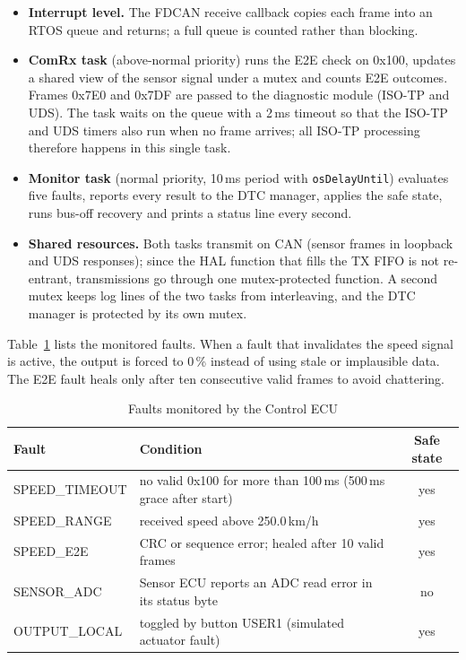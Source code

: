 \begin{itemize}
  \item \textbf{Interrupt level.} The FDCAN receive callback copies each frame into an RTOS queue and returns; a full queue is counted rather than blocking.
  \item \textbf{ComRx task} (above-normal priority) runs the E2E check on 0x100, updates a shared view of the sensor signal under a mutex and counts E2E outcomes. Frames 0x7E0 and 0x7DF are passed to the diagnostic module (ISO-TP and UDS). The task waits on the queue with a 2\,ms timeout so that the ISO-TP and UDS timers also run when no frame arrives; all ISO-TP processing therefore happens in this single task.
  \item \textbf{Monitor task} (normal priority, 10\,ms period with \texttt{osDelayUntil}) evaluates five faults, reports every result to the DTC manager, applies the safe state, runs bus-off recovery and prints a status line every second.
  \item \textbf{Shared resources.} Both tasks transmit on CAN (sensor frames in loopback and UDS responses); since the HAL function that fills the TX FIFO is not re-entrant, transmissions go through one mutex-protected function. A second mutex keeps log lines of the two tasks from interleaving, and the DTC manager is protected by its own mutex.
\end{itemize}

Table~\ref{tab:faults} lists the monitored faults. When a fault that invalidates the speed signal is active, the output is forced to 0\,\% instead of using stale or implausible data. The E2E fault heals only after ten consecutive valid frames to avoid chattering.

\begin{table}[H]
\centering
\small
\caption{Faults monitored by the Control ECU}
\label{tab:faults}
\begin{tabularx}{\textwidth}{@{}lXc@{}}
\toprule
\textbf{Fault} & \textbf{Condition} & \textbf{Safe state} \\
\midrule
SPEED\_TIMEOUT & no valid 0x100 for more than 100\,ms (500\,ms grace after start) & yes \\
SPEED\_RANGE & received speed above 250.0\,km/h & yes \\
SPEED\_E2E & CRC or sequence error; healed after 10 valid frames & yes \\
SENSOR\_ADC & Sensor ECU reports an ADC read error in its status byte & no \\
OUTPUT\_LOCAL & toggled by button USER1 (simulated actuator fault) & yes \\
\bottomrule
\end{tabularx}
\end{table}

